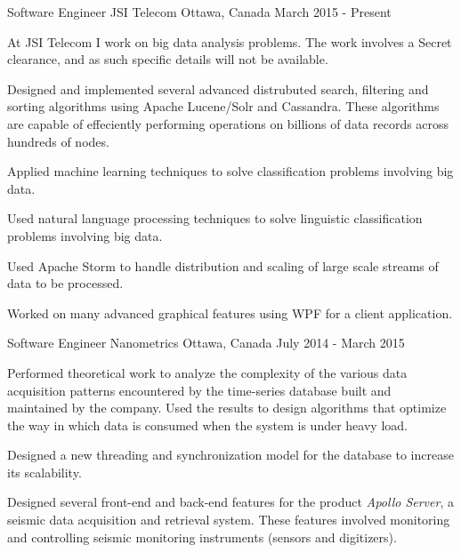 


\begin{cventries}


\cventry
{Software Engineer} %
{JSI Telecom} %
{Ottawa, Canada} %
{March 2015 - Present} %
{ %
\begin{cvitems}
  \item {At JSI Telecom I work on big data analysis problems. The work involves a Secret clearance, and as such specific details will not be available.}
  \item {Designed and implemented several advanced distrubuted search, filtering and sorting algorithms using Apache Lucene/Solr and Cassandra. These algorithms are capable of effeciently performing operations on billions of data records across hundreds of nodes.}
  \item {Applied machine learning techniques to solve classification problems involving big data.}
  \item {Used natural language processing techniques to solve linguistic classification problems involving big data.}
  \item {Used Apache Storm to handle distribution and scaling of large scale streams of data to be processed.}
  \item {Worked on many advanced graphical features using WPF for a client application.}
\end{cvitems}
}


\cventry
{Software Engineer} %
{Nanometrics} %
{Ottawa, Canada} %
{July 2014 - March 2015} %
{ %
\begin{cvitems}
  \item {Performed theoretical work to analyze the complexity of the various data acquisition patterns encountered by the time-series database built and maintained by the company. Used the results to design algorithms that optimize the way in which data is consumed when the system is under heavy load.}
  \item {Designed a new threading and synchronization model for the database to increase its scalability.}
  \item {Designed several front-end and back-end features for the product \emph{Apollo Server}, a seismic data acquisition and retrieval system. These features involved monitoring and controlling seismic monitoring instruments (sensors and digitizers).}
\end{cvitems}
}


\end{cventries}
